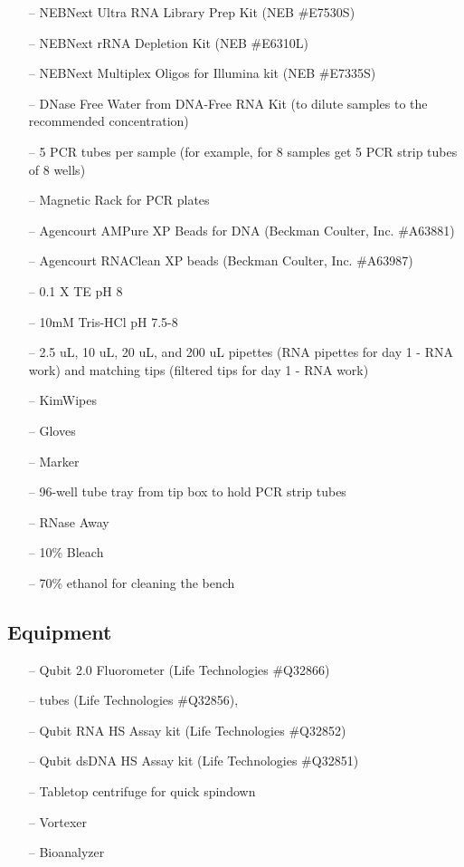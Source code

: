 \documentclass[11pt, oneside]{article}
\begin{document}
		\begin{itemize}
			\itemsep0em
			\item[--] NEBNext Ultra RNA Library Prep Kit (NEB \#E7530S)
			\item[--] NEBNext rRNA Depletion Kit (NEB \#E6310L)
			\item[--] NEBNext Multiplex Oligos for Illumina kit (NEB \#E7335S)
			\item[--] DNase Free Water from DNA-Free RNA Kit (to dilute samples to the recommended concentration)
			\item[--] 5 PCR tubes per sample (for example, for 8 samples get 5 PCR strip tubes of 8 wells)
			\item[--] Magnetic Rack for PCR plates 
			\item[--] Agencourt AMPure XP Beads for DNA (Beckman Coulter, Inc. \#A63881)
			\item[--] Agencourt RNAClean XP beads (Beckman Coulter, Inc. \#A63987)
			\item[--] 0.1 X TE pH 8
			\item[--] 10mM Tris-HCl pH 7.5-8
			\item[--] 2.5 uL, 10 uL, 20 uL, and 200 uL pipettes (RNA pipettes for day 1 - RNA work) and matching tips (filtered tips for day 1 - RNA work)
			\item[--] KimWipes
			\item[--] Gloves
			\item[--] Marker
			\item[--] 96-well tube tray from tip box to hold PCR strip tubes
			\item[--] RNase Away
			\item[--] 10\% Bleach
			\item[--] 70\% ethanol for cleaning the bench 
		\end{itemize}
			
		\vspace{3mm}	
			
	\subsection{Equipment}
		
		\begin{itemize}
			\itemsep0em
			\item[--] Qubit 2.0 Fluorometer (Life Technologies \#Q32866)
			\item[--] tubes (Life Technologies \#Q32856), 
			\item[--] Qubit RNA HS Assay kit (Life Technologies \#Q32852)
			\item[--] Qubit dsDNA HS Assay kit (Life Technologies \#Q32851)
			\item[--] Tabletop centrifuge for quick spindown
			\item[--] Vortexer	
			\item[--] Bioanalyzer
		\end{itemize}
		
\end{document}

